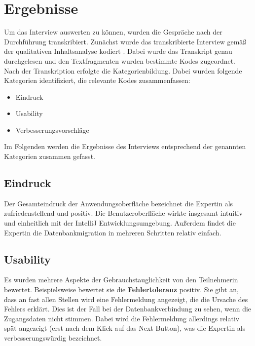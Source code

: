 %
%
%
%
%
%

\section{Ergebnisse}
Um das Interview auswerten zu können, wurden die Gespräche nach der Durchführung transkribiert. Zunächst wurde das transkribierte Interview  gemäß der qualitativen Inhaltsanalyse kodiert \cite{mayring1994qualitative}. Dabei wurde das Transkript genau durchgelesen und den Textfragmenten wurden bestimmte Kodes zugeordnet.
Nach der Transkription erfolgte die Kategorienbildung. Dabei wurden folgende Kategorien identifiziert, die relevante Kodes zusammenfassen:
\begin{itemize}
	\item Eindruck
	\item Usability
	\item Verbesserungsvorschläge
\end{itemize}

Im Folgenden werden die Ergebnisse des Interviews entsprechend der genannten Kategorien zusammen gefasst.

\subsection*{\textbf{Eindruck}}
Der Gesamteindruck der Anwendungsoberfläche bezeichnet die Expertin als zufriedenstellend und positiv. Die Benutzeroberfläche wirkte insgesamt intuitiv und einheitlich mit der IntelliJ Entwicklungsumgebung. Außerdem findet die Expertin die Datenbankmigration in mehreren Schritten relativ einfach. 
\subsection*{\textbf{Usability}}
Es wurden mehrere Aspekte der Gebrauchstauglichkeit von den Teilnehmerin bewertet. Beispielsweise bewertet sie die \textbf{Fehlertoleranz} positiv. Sie gibt an, dass an fast allen Stellen wird eine Fehlermeldung angezeigt, die die Ursache des Fehlers erklärt. Dies ist der Fall bei der Datenbankverbindung zu sehen, wenn die Zugangsdaten nicht stimmen. Dabei wird die Fehlermeldung allerdings relativ spät angezeigt (erst nach dem Klick auf das Next Button), was die Expertin als verbesserungswürdig bezeichnet.


